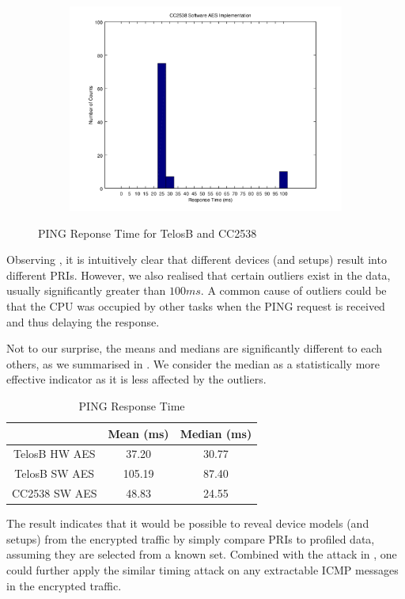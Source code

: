 \begin{figure}[ht!]
\begin{subfigure}{0.4\textwidth}
{	}
	\end{subfigure}
	\begin{subfigure}{0.4\textwidth}
	{
		\includegraphics[width=\textwidth]{fig/noncoresec_ping_cc2538_sw.png}
	}
	\end{subfigure}
	\caption{PING Reponse Time for TelosB and CC2538\label{PINGTiming}}
\end{figure}

Observing , it is intuitively clear that different devices (and setups) result into different PRIs. However, we also realised that certain outliers exist in the data, usually significantly greater than $100ms$. A common cause of outliers could be that the CPU was occupied by other tasks when the PING request is received and thus delaying the response. 

Not to our surprise, the means and medians are significantly different to each others, as we summarised in . We consider the median as a statistically more effective indicator as it is less affected by the outliers. 

\begin{table}[ht!]
	\centering
	{
		\begin{tabular}{|c|c|c|}
			\hline
			              & Mean (ms)     & Median (ms)   \\ \hline
			TelosB HW AES & 37.20 & 30.77 \\ \hline
			TelosB SW AES & 105.19        & 87.40          \\ \hline
			CC2538 SW AES & 48.83         & 24.55          \\ \hline
		\end{tabular}
	}
	\caption{PING Response Time}
	\label{PINGResponseTimeTbl}
\end{table}

The result indicates that it would be possible to reveal device models (and setups) from the encrypted traffic by simply compare PRIs to profiled data, assuming they are selected from a known set. Combined with the attack in , one could further apply the similar timing attack on any extractable ICMP messages in the encrypted traffic.
